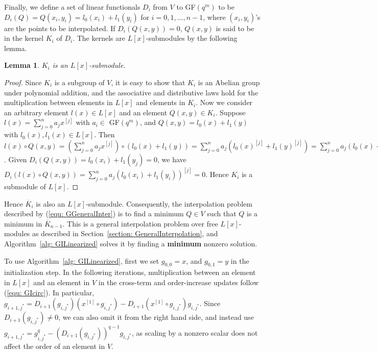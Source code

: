 \documentclass[11pt,onecolumn,draftcls]{IEEEtran}
\newtheorem{lemma}{Lemma}
\begin{document}
Finally, we define a set of linear functionals $D_i$ from $V$ to GF$(q^m)$ to be $D_i(Q) = Q(x_{i}, y_{i}) = l_0(x_i) + l_1(y_i)$ for $i = 0, 1, \ldots, n-1$, where $(x_i, y_i)$'s are the points to be interpolated. If $D_i(Q(x, y)) = 0$, $Q(x, y)$ is said to be in the kernel $K_i$ of $D_i$. The kernels are $L[x]$-submodules by the following lemma.

\begin{lemma} \label{lemma: LxKernels}
$K_i$ is an $L[x]$-submodule.
\end{lemma}
\begin{proof}
Since $K_i$ is a subgroup of $V$, it is easy to show that $K_i$ is an Abelian group under polynomial addition, and the associative  and distributive laws hold for the multiplication between elements in $L[x]$ and elements in $K_i$. Now we consider an arbitrary element $l(x) \in L[x]$ and an element $Q(x, y) \in K_i$. Suppose $l(x) = \sum_{j=0}^{n} a_j x^{[j]}$ with $a_i \in $ GF$(q^m)$, and $Q(x, y) = l_0(x) + l_1(y)$ with $l_0(x), l_1(x) \in L[x]$. Then $l(x) \circ Q(x, y) = (\sum_{j=0}^{n} a_j x^{[j]}) \circ (l_0(x) + l_1(y)) = \sum_{j=0}^{n} a_j (l_0(x)^{[j]} + l_1(y)^{[j]}) = \sum_{j=0}^{n} a_j (l_0(x) + l_1(y))^{[j]}$. Given $D_i(Q(x, y)) = l_0(x_i) + l_1(y_j) =0$, we have  $D_i(l(x) \circ Q(x, y)) = \sum_{j=0}^{n} a_j (l_0(x_i) + l_1(y_i))^{[j]} = 0$. Hence $K_i$ is a submodule of $L[x]$.
\end{proof}

Hence $\overline{K}_i$ is also an $L[x]$-submodule. Consequently, the interpolation problem described by (\ref{equ: GGeneralInter}) is to find a minimum $Q\in V$ such that $Q$ is a minimum in $\overline{K}_{n-1}$. This is a general interpolation problem over free $L[x]$-modules as described in Section~\ref{section: GeneralInterpolation}, and Algorithm~\ref{alg: GILinearized} solves it by finding a \textbf{minimum} nonzero solution.

To use Algorithm~\ref{alg: GILinearized}, first we set $g_{0,0} = x$, and $g_{0,1} = y$ in the initialization step. In the following iterations, multiplication between an element in $L[x]$ and an element in $V$ in the cross-term and order-increase updates follow (\ref{equ: GIcirc}). In particular, $g_{i+1,j^*} = D_{i+1}(g_{i, j^*}) (x^{[1]}\circ g_{i, j^*}) - D_{i+1}(x^{[1]}\circ g_{i, j^*} ) g_{i, j^*}$. Since $D_{i+1}(g_{i, j^*}) \ne 0$, we can also omit it from the right hand side, and instead use $g_{i+1,j^*} = g_{i, j^*}^q - (D_{i+1}(g_{i, j^*}))^{q-1} g_{i, j^*}$, as scaling by a nonzero scalar does not affect the order of an element in $V$.
\end{document}
